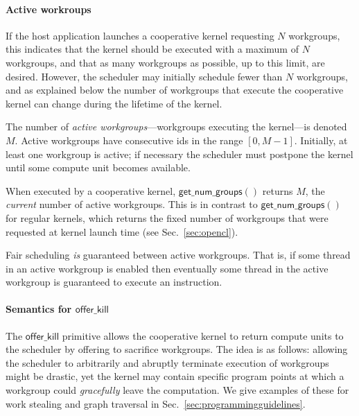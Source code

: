 \documentclass[numbers,nocopyrightspace,10pt]{sigplanconf}
\newcommand{\mysec}{Sec.~}
\newcommand{\offerkill}{\mathsf{offer\_kill}}
\newcommand{\getnumgroups}{\mathsf{get\_num\_groups}}
\begin{document}
\paragraph{Active workroups}

If the host application launches a cooperative kernel requesting $N$
workgroups, this indicates that the kernel should be executed with a
maximum of $N$ workgroups, and that as many workgroups as possible, up
to this limit, are desired.  However, the scheduler may initially
schedule fewer than $N$ workgroups, and as explained below the number
of workgroups that execute the cooperative kernel can change during
the lifetime of the kernel.

The number of \emph{active workgroups}---workgroups executing the
kernel---is denoted $M$.  Active workgroups
have consecutive ids in the range $[0, M-1]$.
Initially, at least one workgroup is active;
if necessary the scheduler must postpone the kernel until
some compute unit becomes available.  

When executed by a cooperative
kernel, $\getnumgroups()$ returns $M$, the \emph{current} number of
active workgroups.  This is in contrast to $\getnumgroups()$ for
regular kernels, which returns the fixed number of workgroups that
were requested at kernel launch time (see \mysec\ref{sec:opencl}).

Fair scheduling \emph{is} guaranteed between active workgroups.  That is, if
some thread in an active workgroup is enabled then eventually some
thread in the active workgroup is guaranteed to execute an
instruction.


\paragraph{Semantics for $\offerkill$}

The $\offerkill$ primitive allows the cooperative kernel to return
compute units to the scheduler by offering to sacrifice workgroups.
The idea is as follows: allowing the scheduler to arbitrarily and abruptly terminate execution
of workgroups might be drastic, yet the kernel
may contain specific program points at which a workgroup could
\emph{gracefully} leave the computation.  We give examples of these
for work stealing and graph traversal in \mysec\ref{sec:programmingguidelines}.
\end{document}
